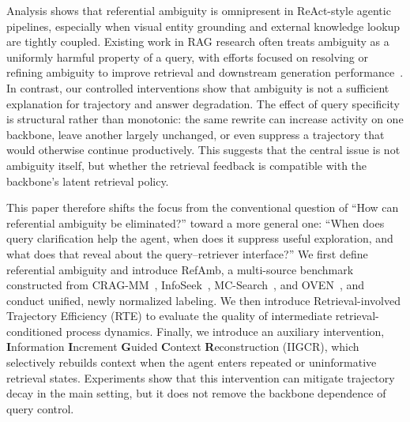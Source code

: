 \documentclass{article} %
\begin{document}
Analysis shows that referential ambiguity is omnipresent in ReAct-style agentic pipelines, especially when visual entity grounding and external knowledge lookup are tightly coupled. Existing work in RAG research often treats ambiguity as a uniformly harmful property of a query, with efforts focused on resolving or refining ambiguity to improve retrieval and downstream generation performance~\citep{chan2024rq,jang2025ambiguity,liu2023we}. In contrast, our controlled interventions show that ambiguity is not a sufficient explanation for trajectory and answer degradation.
The effect of query specificity is structural rather than monotonic: the same rewrite can increase activity on one backbone, leave another largely unchanged, or even suppress a trajectory that would otherwise continue productively.
This suggests that the central issue is not ambiguity itself, but whether the retrieval feedback is compatible with the backbone's latent retrieval policy.

This paper therefore shifts the focus from the conventional question of ``How can referential ambiguity be eliminated?'' toward a more general one: ``When does query clarification help the agent, when does it suppress useful exploration, and what does that reveal about the query--retriever interface?''
We first define referential ambiguity and introduce RefAmb, a multi-source benchmark constructed from CRAG-MM~\citep{yang2024crag}, InfoSeek~\citep{chen2023can}, MC-Search~\citep{ning2026mc}, and OVEN~\citep{hu2023open}, and conduct unified, newly normalized labeling.
We then introduce Retrieval-involved Trajectory Efficiency (RTE) to evaluate the quality of intermediate retrieval-conditioned process dynamics.
Finally, we introduce an auxiliary intervention, \textbf{I}nformation \textbf{I}ncrement \textbf{G}uided \textbf{C}ontext \textbf{R}econstruction (IIGCR), which selectively rebuilds context when the agent enters repeated or uninformative retrieval states.
Experiments show that this intervention can mitigate trajectory decay in the main setting, but it does not remove the backbone dependence of query control.
\end{document}
